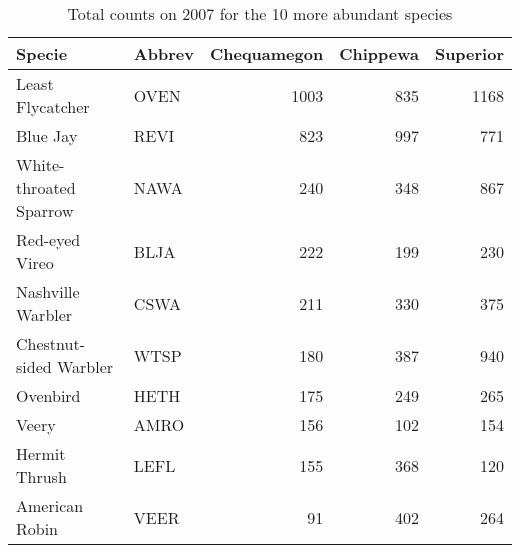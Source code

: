 \begin{table}[ht]
\centering
\caption{Total counts on 2007 for the 10 more abundant species} 
\begin{tabular}{llrrr}
  \hline
Specie & Abbrev & Chequamegon & Chippewa & Superior \\ 
  \hline
Least Flycatcher & OVEN & 1003 & 835 & 1168 \\ 
  Blue Jay & REVI & 823 & 997 & 771 \\ 
  White-throated Sparrow & NAWA & 240 & 348 & 867 \\ 
  Red-eyed Vireo & BLJA & 222 & 199 & 230 \\ 
  Nashville Warbler & CSWA & 211 & 330 & 375 \\ 
  Chestnut-sided Warbler & WTSP & 180 & 387 & 940 \\ 
  Ovenbird & HETH & 175 & 249 & 265 \\ 
  Veery & AMRO & 156 & 102 & 154 \\ 
  Hermit Thrush & LEFL & 155 & 368 & 120 \\ 
  American Robin & VEER &  91 & 402 & 264 \\ 
   \hline
\end{tabular}
\end{table}
